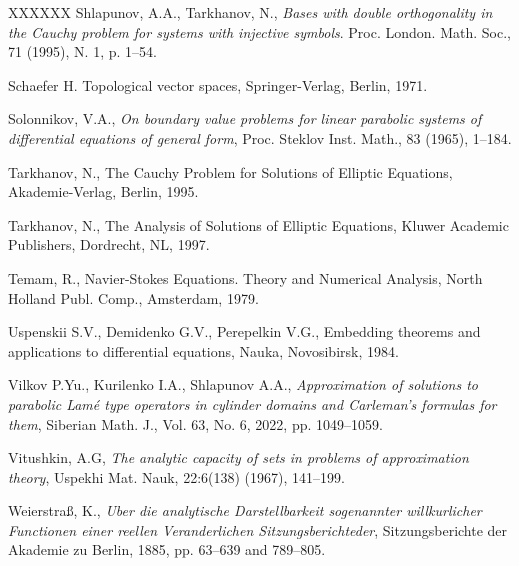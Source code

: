 \documentclass{amsart}
\theoremstyle{definition}
\theoremstyle{remark}
\numberwithin{equation}{section}
\begin{document}
\begin{thebibliography}{XXXXXX}
{Shlapunov, A.A.,  Tarkhanov, N.}, 
\textit{ Bases with double orthogonality in the Cauchy problem for systems with 
injective symbols}. Proc. London. Math. Soc.,  71 (1995), N. 1, p. 1--54. 

 Schaefer H. {Topological vector spaces}, Springer-Verlag, Berlin, 1971.

Solonnikov, V.A., 
 \textit{On boundary value problems for linear parabolic systems of differential equations of 
general form}, Proc. Steklov Inst. Math., 83 (1965), 1--184.

{Tarkhanov, N.},
{The Cauchy Problem for Solutions of Elliptic Equations},
 Akademie-Verlag, Berlin, 1995.

{Tarkhanov, N.},
 {The Analysis of Solutions of Elliptic Equations},
 Kluwer Academic Publishers, Dordrecht, NL, 1997.

Temam, R.,
{Navier-Stokes Equations. Theory and Numerical Analysis},
  North Holland Publ. Comp., Amsterdam, 1979.

Uspenskii S.V., Demidenko G.V., Perepelkin V.G., 
{Embedding theorems and applications to differential equations}, 
 Nauka, Novosibirsk, 1984. 


Vilkov P.Yu., Kurilenko I.A., Shlapunov A.A., 
\textit{Approximation of solutions to parabolic Lam\'e type operators in cylinder domains and 
Carleman's  formulas for them},  Siberian Math. J., Vol. 63, No. 6, 2022, pp. 1049--1059. 

Vitushkin, A.G, 
\textit{The analytic capacity of sets in problems of approximation theory}, 
Uspekhi Mat. Nauk, 22:6(138) (1967),  141--199. 

Weierstra\ss{}, K., \textit{Uber die analytische Darstellbarkeit sogenannter 
willkurlicher Fu\-nc\-tio\-nen einer reellen Veranderlichen Sitzungsberichteder}, 
Sitzungsberichte der Akademie zu Berlin, 1885, pp. 63--639 and 789--805.

\end{thebibliography}
\end{document}
